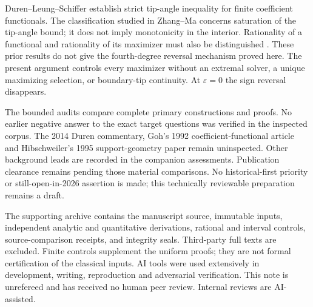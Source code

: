 \documentclass[10pt]{article}
\newcommand{\eps}{\varepsilon}
\begin{document}
Duren--Leung--Schiffer \cite{DLS} establish strict tip-angle inequality
for finite coefficient functionals. The classification studied in
Zhang--Ma \cite{ZM} concerns saturation of the tip-angle bound;
it does not imply monotonicity in the interior.
Rationality of a functional and rationality of its maximizer must also
be distinguished \cite{Brickman,Goh}. These prior results do not give
the fourth-degree reversal mechanism proved here.
The present argument controls every maximizer without an extremal
solver, a unique maximizing selection, or boundary-tip continuity.
At \(\eps=0\) the sign reversal disappears.

The bounded audits compare complete primary constructions and proofs.
No earlier negative answer to the exact target questions was verified
in the inspected corpus. The 2014 Duren commentary, Goh's 1992
coefficient-functional article and Hibschweiler's 1995 support-geometry
paper remain uninspected. Other background leads are recorded in
the companion assessments.
Publication clearance remains pending those material comparisons.
No historical-first priority or still-open-in-2026 assertion is made;
this technically reviewable preparation remains a draft.

The supporting archive contains the manuscript source, immutable
inputs, independent analytic and quantitative derivations, rational
and interval controls, source-comparison receipts, and integrity seals.
Third-party full texts are excluded. Finite controls supplement the
uniform proofs; they are not formal certification of the classical
inputs. AI tools were used extensively in development, writing,
reproduction and adversarial verification. This note is unrefereed
and has received no human peer review. Internal reviews are AI-assisted.
\end{document}
